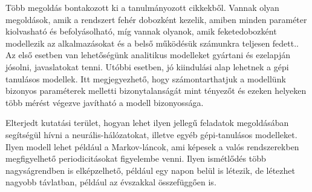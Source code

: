Több megoldás bontakozott ki a tanulmányozott cikkekből. Vannak olyan megoldások, amik a rendszert fehér dobozként kezelik, amiben minden paraméter kiolvasható és befolyásolható, míg vannak olyanok, amik feketedobozként modellezik az alkalmazásokat és a belső működésük számunkra teljesen fedett.\citep{TowardsAnAdaptive}. Az első esetben van lehetőségünk analitikus modelleket gyártani és ezelapján jósolni, javaslatokat tenni. Utóbbi esetben, jó kiindulási alap lehetnek a gépi tanulásos modellek. Itt megjegyezhető, hogy számontarthatjuk a modellünk bizonyos paraméterek melletti bizonytalanságát mint tényezőt és ezeken helyeken több mérést végezve javítható a modell bizonyossága\citep{TowardsAnAdaptive}.

Elterjedt kutatási terület, hogyan lehet ilyen jellegű feladatok megoldásában segítségül hívni a neurális-hálózatokat, illetve egyéb gépi-tanulásos modelleket. Ilyen modell lehet például a Markov-láncok, ami képesek a valós rendszerekben megfigyelhető periodicitásokat figyelembe venni\citep{CloudScale}. Ilyen ismétlődés több nagyságrendben is elképzelhető, például egy napon belül is létezik, de létezhet nagyobb távlatban, például az évszakkal összefüggően is\citep{PredictingUsageAndProactiveScaling}.




